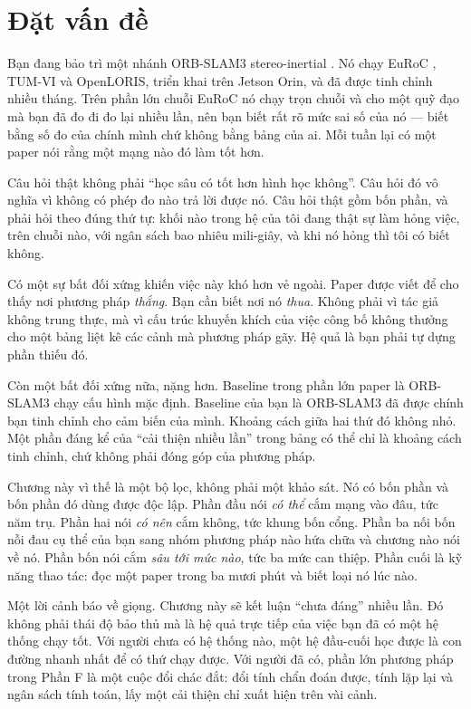 \documentclass[../../deep_learning.tex]{subfiles}
\begin{document}
\section{Đặt vấn đề}
Bạn đang bảo trì một nhánh ORB-SLAM3 stereo-inertial \cite{campos2021orbslam3}. Nó chạy EuRoC \cite{burri2016euroc}, TUM-VI \cite{schubert2018tumvi} và OpenLORIS, triển khai trên Jetson Orin, và đã được tinh chỉnh nhiều tháng. Trên phần lớn chuỗi EuRoC nó chạy trọn chuỗi và cho một quỹ đạo mà bạn đã đo đi đo lại nhiều lần, nên bạn biết rất rõ mức sai số của nó --- biết bằng số đo của chính mình chứ không bằng bảng của ai. Mỗi tuần lại có một paper nói rằng một mạng nào đó làm tốt hơn.

Câu hỏi thật không phải ``học sâu có tốt hơn hình học không''. Câu hỏi đó vô nghĩa vì không có phép đo nào trả lời được nó. Câu hỏi thật gồm bốn phần, và phải hỏi theo đúng thứ tự: khối nào trong hệ của tôi đang thật sự làm hỏng việc, trên chuỗi nào, với ngân sách bao nhiêu mili-giây, và khi nó hỏng thì tôi có biết không.

Có một sự bất đối xứng khiến việc này khó hơn vẻ ngoài. Paper được viết để cho thấy nơi phương pháp \emph{thắng}. Bạn cần biết nơi nó \emph{thua}. Không phải vì tác giả không trung thực, mà vì cấu trúc khuyến khích của việc công bố không thưởng cho một bảng liệt kê các cảnh mà phương pháp gãy. Hệ quả là bạn phải tự dựng phần thiếu đó.

Còn một bất đối xứng nữa, nặng hơn. Baseline trong phần lớn paper là ORB-SLAM3 chạy cấu hình mặc định. Baseline của bạn là ORB-SLAM3 đã được chính bạn tinh chỉnh cho cảm biến của mình. Khoảng cách giữa hai thứ đó không nhỏ. Một phần đáng kể của ``cải thiện nhiều lần'' trong bảng có thể chỉ là khoảng cách tinh chỉnh, chứ không phải đóng góp của phương pháp.

Chương này vì thế là một bộ lọc, không phải một khảo sát. Nó có bốn phần và bốn phần đó dùng được độc lập. Phần đầu nói \emph{có thể} cắm mạng vào đâu, tức năm trụ. Phần hai nói \emph{có nên} cắm không, tức khung bốn cổng. Phần ba nối bốn nỗi đau cụ thể của bạn sang nhóm phương pháp nào hứa chữa và chương nào nói về nó. Phần bốn nói cắm \emph{sâu tới mức nào}, tức ba mức can thiệp. Phần cuối là kỹ năng thao tác: đọc một paper trong ba mươi phút và biết loại nó lúc nào.

Một lời cảnh báo về giọng. Chương này sẽ kết luận ``chưa đáng'' nhiều lần. Đó không phải thái độ bảo thủ mà là hệ quả trực tiếp của việc bạn đã có một hệ thống chạy tốt. Với người chưa có hệ thống nào, một hệ đầu-cuối học được là con đường nhanh nhất để có thứ chạy được. Với người đã có, phần lớn phương pháp trong Phần F là một cuộc đổi chác đắt: đổi tính chẩn đoán được, tính lặp lại và ngân sách tính toán, lấy một cải thiện chỉ xuất hiện trên vài cảnh.
\end{document}
